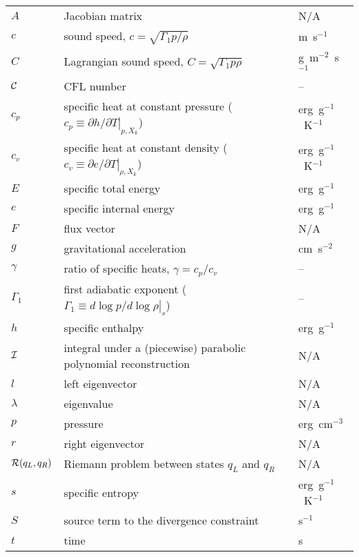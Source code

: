 \begin{center}
\begin{longtable}{|l|p{4.0in}|l|}
\hline 
\endlastfoot
$A$     & Jacobian matrix  & N/A \\
%
$c$     & sound speed, $c = \sqrt{\Gamma_1 p/\rho}$  & m~s$^{-1}$ \\
%
$C$       & Lagrangian sound speed, $C = \sqrt{\Gamma_1 p \rho}$ & g~m$^{-2}$~s$^{-1}$\\
%
${\mathcal{C}}$    & CFL number & --\\
%
$c_p$   & specific heat at constant pressure
          ($c_p \equiv \left . \partial h / \partial T \right |_{p,X_k}$)
        & erg~g$^{-1}$~K$^{-1}$ \\
%
$c_v$   & specific heat at constant density
          ($c_v \equiv \left . \partial e / \partial T \right |_{\rho,X_k}$)
        & erg~g$^{-1}$~K$^{-1}$ \\
%
$E$     & specific total energy                      & erg~g$^{-1}$ \\
%
$e$     & specific internal energy                   & erg~g$^{-1}$ \\
%
$F$     & flux vector                                & N/A \\
%
$g$     & gravitational acceleration                 & cm~s$^{-2}$ \\
%
$\gamma$ & ratio of specific heats, $\gamma = c_p/c_v$ & -- \\
%
$\Gamma_1$ & first adiabatic exponent ($\Gamma_1 \equiv \left . d \log p/d \log \rho \right |_s$) & -- \\
%
$h$     & specific enthalpy                          & erg~g$^{-1}$ \\
%
${\mathcal{I}}$   & integral under a (piecewise) parabolic polynomial reconstruction & N/A \\
%
$l$     & left eigenvector                           & N/A \\
%
$\lambda$ & eigenvalue                               & N/A \\
% 
$p$     & pressure                                   & erg~cm$^{-3}$ \\
%
$r$     & right eigenvector                          & N/A \\
%
${\mathcal{R}}(q_L, q_R)$ & Riemann problem between states $q_L$ and $q_R$ & N/A \\
%
$s$     & specific entropy                           & erg~g$^{-1}$~K$^{-1}$ \\
%
$S$     & source term to the divergence constraint   & s$^{-1}$ \\
%
$t$     & time                                       & s \\

\end{longtable}
\end{center}

